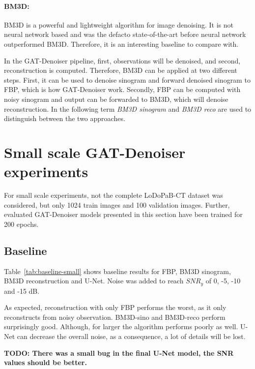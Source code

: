 \paragraph{BM3D:}
BM3D is a powerful and lightweight algorithm for image denoising. 
It is not neural network based and was the defacto state-of-the-art before neural network outperformed
BM3D. Therefore, it is an interesting baseline to compare with.

In the GAT-Denoiser pipeline, first, observations will be denoised, and second, reconstruction is computed.
Therefore, BM3D can be applied at two different steps. First, it can be used to denoise sinogram
and forward denoised sinogram to FBP, which is how GAT-Denoiser work. Secondly, FBP can be
computed with noisy sinogram and output can be forwarded to BM3D, which will denoise reconstruction.
In the following term \textit{BM3D sinogram} and \textit{BM3D reco} 
are used to distinguish between the two approaches.

\section{Small scale GAT-Denoiser experiments}
For small scale experiments, not the complete LoDoPaB-CT dataset was considered, but only 1024 train images
and 100 validation images. 
Further, evaluated GAT-Denoiser models presented in this section have been trained for 200 epochs.

\subsection{Baseline}

Table~\ref{tab:baseline-small} shows baseline results for FBP, BM3D sinogram, BM3D reconstruction and U-Net.
Noise was added to reach $\textit{SNR}_y$ of 0, -5, -10 and -15 dB.

As expected, reconstruction with only FBP performs the worst, as it only reconstructs from noisy observation.
BM3D-sino and BM3D-reco perform surprisingly good.
Although, for larger \snry the algorithm performs poorly as well.
U-Net can decrease the overall noise, as a consequence, a lot of details will be lost.

\textbf{TODO: There was a small bug in the final U-Net model, the SNR values should be better.}


